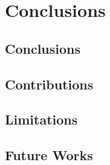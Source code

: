 \chapter{Conclusions} \label{chap:conc}

\section{Conclusions}

\section{Contributions}

\section{Limitations}

\section{Future Works}

